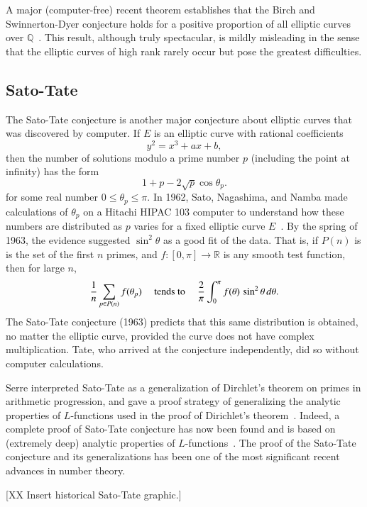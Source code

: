 \documentclass{llncs}
\newcommand{\ring}[1]{\mathbb{#1}}
\begin{document}
A major (computer-free) recent theorem establishes that the Birch and Swinnerton-Dyer
conjecture holds for a positive proportion of all elliptic curves over
$\ring{Q}$~\cite{BS:2010}.  This result, although truly spectacular, is
mildly misleading in the sense that the elliptic curves of high rank rarely
occur but pose the greatest difficulties.





\subsection{Sato-Tate}

The Sato-Tate conjecture is another major conjecture about elliptic
curves that was discovered by computer.  If $E$ is an elliptic curve
with rational coefficients
\[
y^2 = x^3 + a x + b,
\]
then the number of solutions modulo a prime number $p$ (including the
point at infinity) has the form
\[
1 + p - 2\sqrt{p}\cos\theta_p.
\]
for some real number $0\le \theta_p\le \pi$.  In 1962, Sato,
Nagashima, and Namba made calculations  of $\theta_p$ on a Hitachi
HIPAC 103 computer to understand how these numbers are distributed as
$p$ varies for a fixed elliptic curve $E$~\cite{Sch}.  By the spring of 1963, the
evidence suggested  $\sin^2\theta$ as a good fit of the data.
That is, if $P(n)$ is is the set of the first $n$ primes, and
$f:[0,\pi]\to\ring{R}$ is any smooth test function, then for large
$n$,
\[
\frac{1}{n}\sum_{p\in P(n)} f(\theta_p) \quad\hbox{ tends to }\quad
\frac{2}{\pi}\int_0^\pi f(\theta)\,\sin^2\theta\,d\theta.
\]
The Sato-Tate conjecture (1963) predicts that this same distribution is
obtained, no matter the elliptic curve, provided the curve does not
have complex multiplication.  Tate, who arrived at the conjecture
independently, did so without computer calculations.

Serre interpreted Sato-Tate as a generalization of Dirchlet's
theorem on primes in arithmetic progression, and gave a proof strategy
of generalizing the analytic properties of $L$-functions used in
the proof of Dirichlet's theorem~\cite{Se68}.  Indeed, a complete proof of Sato-Tate
conjecture has now been found and is based on (extremely deep)
analytic properties of $L$-functions~\cite{Car:Bourbaki}.
The proof of the Sato-Tate conjecture and its generalizations has been
one of the most significant recent advances in number theory.

[XX Insert historical Sato-Tate graphic.]

\end{document}
